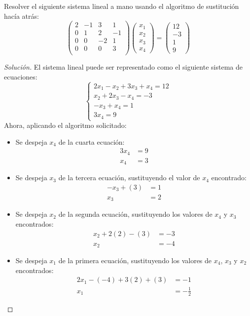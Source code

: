 \documentclass[12pt]{book}
\newenvironment{solucion}
  {\renewcommand\qedsymbol{$\square$}\begin{proof}[Solución]}
  {\end{proof}}
\begin{document}
\eje Resolver el siguiente sistema lineal a mano usando el algoritmo de sustitución hacía atrás:
    \[
        \begin{pmatrix}
            2 & -1 & 3 & 1\\
            0 & 1 & 2 & -1\\
            0 & 0 & -2 & 1\\
            0 & 0 & 0 & 3\\
        \end{pmatrix}\begin{pmatrix}
            x_1\\
            x_2\\
            x_3\\
            x_4
        \end{pmatrix}=\begin{pmatrix}
            12\\
            -3\\
            1\\
            9
        \end{pmatrix}
    \]
\begin{solucion}
El sistema lineal puede ser representado como el siguiente sistema de ecuaciones:
    \[
        \begin{cases}
            2x_1-x_2+3x_3+x_4=12\\
            x_2+2x_3-x_4=-3\\
            -x_3+x_4=1\\
            3x_4=9
        \end{cases}
    \]
Ahora, aplicando el algoritmo solicitado:
\begin{itemize}
    \item Se despeja $x_4$ de la cuarta ecuación:
        \begin{align*}
            3x_4&=9 \\ 
            x_4&=3
        \end{align*}
    \item Se despeja $x_3$ de la tercera ecuación, sustituyendo el valor de $x_4$ encontrado:
        \begin{align*}
            -x_3+(3)&=1 \\ 
            x_3&=2
        \end{align*}
    \item Se despeja $x_2$ de la segunda ecuación, sustituyendo los valores de $x_4$ y $x_3$ encontrados:
        \begin{align*}
            x_2+2(2)-(3)&=-3\\
            x_2&=-4
        \end{align*}
    \item Se despeja $x_1$ de la primera ecuación, sustituyendo los valores de $x_4$, $x_3$ y $x_2$ encontrados:
        \begin{align*}
            2x_1-(-4)+3(2)+(3)&=-1\\
            x_1&=-\frac{1}{2}
        \end{align*}
\end{itemize}
\end{solucion}
\end{document}
